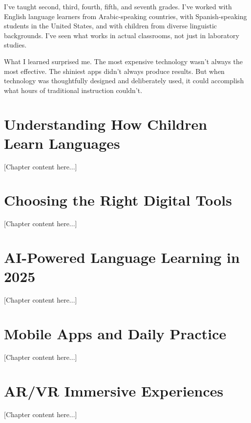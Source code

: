 \documentclass[11pt,oneside]{book}
\begin{document}
I've taught second, third, fourth, fifth, and seventh grades. I've worked with English language learners from Arabic-speaking countries, with Spanish-speaking students in the United States, and with children from diverse linguistic backgrounds. I've seen what works in actual classrooms, not just in laboratory studies.

What I learned surprised me. The most expensive technology wasn't always the most effective. The shiniest apps didn't always produce results. But when technology was thoughtfully designed and deliberately used, it could accomplish what hours of traditional instruction couldn't.


\chapter{Understanding How Children Learn Languages}

[Chapter content here...]

\chapter{Choosing the Right Digital Tools}

[Chapter content here...]

\chapter{AI-Powered Language Learning in 2025}

[Chapter content here...]

\chapter{Mobile Apps and Daily Practice}

[Chapter content here...]

\chapter{AR/VR Immersive Experiences}

[Chapter content here...]
\end{document}
